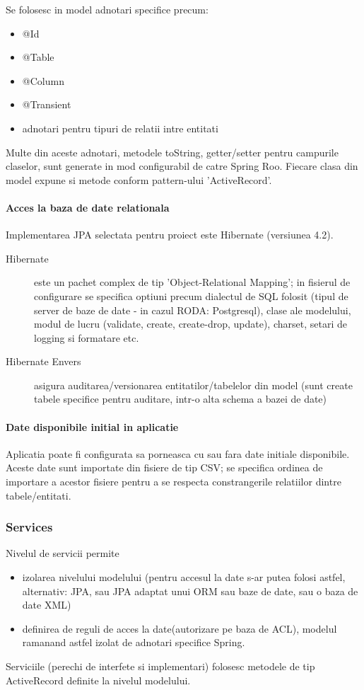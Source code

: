Se folosesc in model adnotari specifice precum:
\begin{itemize}
  \item @Id
  \item @Table
  \item @Column
  \item @Transient
  \item adnotari pentru tipuri de relatii intre entitati
\end{itemize}

Multe din aceste adnotari, metodele toString, getter/setter pentru
campurile claselor, sunt generate in mod configurabil de catre Spring Roo.
Fiecare clasa din model expune si metode conform pattern-ului 'ActiveRecord'. 

\paragraph{Acces la baza de date relationala}
Implementarea JPA selectata pentru proiect este Hibernate (versiunea 4.2).
\begin{description}
\item[Hibernate] este un pachet complex de tip 'Object-Relational Mapping';
in fisierul de configurare se specifica optiuni precum dialectul de SQL folosit
(tipul de server de baze de date - in cazul RODA: Postgresql), clase ale
modelului, modul de lucru (validate, create, create-drop, update), 
charset, setari de logging si formatare etc.
\item[Hibernate Envers] asigura auditarea/versionarea entitatilor/tabelelor din
model (sunt create tabele specifice pentru auditare, intr-o alta schema a bazei
de date)
\end{description}

\paragraph{Date disponibile initial in aplicatie}
Aplicatia poate fi configurata sa porneasca cu sau fara date initiale
disponibile.
Aceste date sunt importate din fisiere de tip CSV; se specifica ordinea de
importare a acestor fisiere pentru a se respecta constrangerile relatiilor
dintre tabele/entitati.

\subsubsection{Services}
Nivelul de servicii permite 
\begin{itemize}
  \item izolarea nivelului modelului (pentru accesul la
date s-ar putea folosi astfel, alternativ: JPA, sau JPA adaptat unui ORM sau
baze de date, sau o baza de date XML)
  \item definirea de reguli de acces la date(autorizare pe baza de ACL), modelul
  ramanand astfel izolat de adnotari specifice Spring.
\end{itemize} 
Serviciile (perechi de interfete si implementari) folosesc 
metodele de tip ActiveRecord definite la nivelul modelului.

